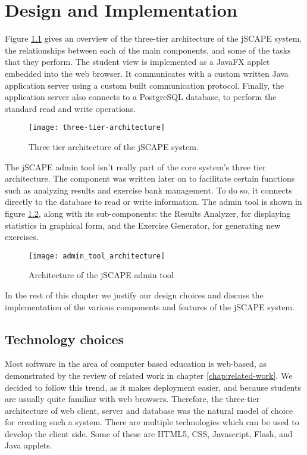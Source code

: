\chapter{Design and Implementation}
\label{chap:implementation}
Figure \ref{fig:three-tier-architecture} gives an overview of the three-tier architecture of the jSCAPE system, the relationships between each of the main components, and some of the tasks that they perform. The student view is implemented as a JavaFX applet embedded into the web browser. It communicates with a custom written Java application server using a custom built communication protocol. Finally, the application server also connects to a PostgreSQL database, to perform the standard read and write operations. \newline

\begin{figure}[H]
\centering
\texttt{[image: three-tier-architecture]}
\caption{Three tier architecture of the jSCAPE system.}
\label{fig:three-tier-architecture}
\end{figure}

The jSCAPE admin tool isn't really part of the core system's three tier architecture. The component was written later on to facilitate certain functions such as analyzing results and exercise bank management. To do so, it connects directly to the database to read or write information. The admin tool is shown in figure  \ref{fig:admin_tool_architecture}, along with its sub-components: the Results Analyzer, for displaying statistics in graphical form, and the Exercise Generator, for generating new exercises.

\begin{figure}[H]
\centering
\texttt{[image: admin\_tool\_architecture]}
\caption{Architecture of the jSCAPE admin tool}
\label{fig:admin_tool_architecture}
\end{figure}

In the rest of this chapter we justify our design choices and discuss the implementation of the various components and features of the jSCAPE system.

\section{Technology choices}
Most software in the area of computer based education is web-based, as demonstrated by the review of related work in chapter \ref{chap:related-work}. We decided to follow this trend, as it makes deployment easier, and because students are usually quite familiar with web browsers. Therefore, the three-tier architecture of web client, server and database was the natural model of choice for creating such a system. There are multiple technologies which can be used to develop the client side. Some of these are HTML5, CSS, Javascript, Flash, and Java applets.\newline

